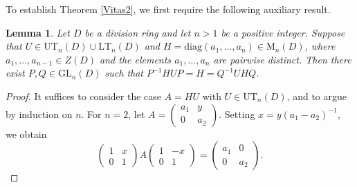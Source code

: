 \documentclass[11pt]{article}
\newtheorem{lemma}[theorem]{Lemma}
\theoremstyle{definition}
\begin{document}
{{{{				To establish Theorem \ref{Vitas2}, we first require the following auxiliary result.
				
				\begin{lemma}\label{BiSo}
					Let \( D \) be a division ring and let \( n >1  \) be a positive integer. Suppose that \( U \in \mathrm{UT}_n(D) \cup \mathrm{LT}_n(D) \) and \( H = \mathrm{diag}(a_1, \ldots, a_n) \in \mathrm{M}_n(D) \), where \( a_1, \ldots, a_{n-1} \in Z(D) \) and the elements \( a_1, \ldots, a_n \) are pairwise distinct. Then there exist \( P, Q \in \mathrm{GL}_n(D) \) such that
					$
					P^{-1} H U P = H = Q^{-1} U H Q.
					$
				\end{lemma}
				
				\begin{proof}
					It suffices to consider the case \( A = H U \) with \( U \in \mathrm{UT}_n(D) \), and to argue by induction on \( n \). For \( n = 2 \), let
					$
					A =
					\begin{pmatrix}
						a_1 & y \\
						0 & a_2
					\end{pmatrix}.
					$
					Setting \( x = y(a_1 - a_2)^{-1} \), we obtain
					\[
					\begin{pmatrix}
						1 & x \\
						0 & 1
					\end{pmatrix}
					A
					\begin{pmatrix}
						1 & -x \\
						0 & 1
					\end{pmatrix}
					=
					\begin{pmatrix}
						a_1 & 0 \\
						0 & a_2
					\end{pmatrix}.
					\]
					

\end{proof}}}}}
\end{document}
